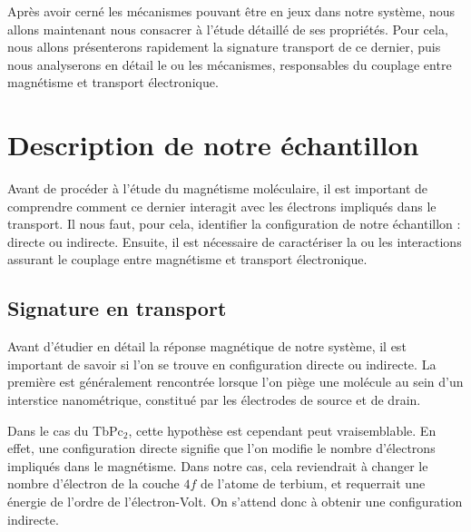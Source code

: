 Après avoir cerné les mécanismes pouvant être en jeux dans notre système, nous allons maintenant nous consacrer à l'étude détaillé de ses propriétés. Pour cela, nous allons présenterons rapidement la signature transport de ce dernier, puis nous analyserons en détail le ou les mécanismes, responsables du couplage entre magnétisme et transport électronique.

\section{Description de notre échantillon}
Avant de procéder à l'étude du magnétisme moléculaire, il est important de comprendre comment ce dernier interagit avec les électrons impliqués dans le transport. Il nous faut, pour cela, identifier la configuration de notre échantillon : directe ou indirecte. Ensuite, il est nécessaire de caractériser la ou les interactions assurant le couplage entre magnétisme et transport électronique.


\subsection{Signature en transport}

Avant d'étudier en détail la réponse magnétique de notre système, il est important de savoir si l'on se trouve en configuration directe ou indirecte. La première est généralement rencontrée lorsque l'on piège une molécule au sein d'un interstice nanométrique, constitué par les électrodes de source et de drain.

Dans le cas du TbPc$_{2}$, cette hypothèse est cependant peut vraisemblable. En effet, une configuration directe signifie que l'on modifie le nombre d'électrons impliqués dans le magnétisme. Dans notre cas, cela reviendrait à changer le nombre d'électron de la couche $4f$ de l'atome de terbium, et requerrait une énergie de l'ordre de l'électron-Volt. On s'attend donc à obtenir une configuration indirecte.

